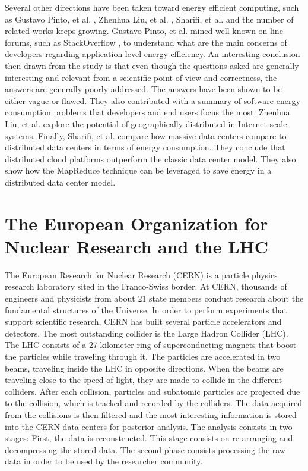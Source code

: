 Several other directions have been taken toward energy efficient computing, such as Gustavo Pinto, et al. \cite{QUESTIONS_ENERGY}, Zhenhua Liu, et al. \cite{GREENING}, Sharifi, et al.
\cite{ENERGY_DILEMMA} and the number of related works keeps growing. Gustavo Pinto, et al. \cite{QUESTIONS_ENERGY} mined well-known on-line forums, such as StackOverflow \cite{STACKOVERFLOW}, to understand what are the main concerns of developers regarding application level energy efficiency. An interesting conclusion then drawn from the study is that even though the questions asked are generally interesting and relevant from a scientific point of view and correctness, the answers are generally poorly addressed. The answers have been shown to be either vague or flawed. They also contributed with a summary of software energy consumption problems that developers and end users focus the most. Zhenhua Liu, et al. \cite{GREENING} explore the potential of geographically distributed in Internet-scale systems. Finally, Sharifi, et al. \cite{ENERGY_DILEMMA} compare how massive data centers compare to distributed data centers in terms of energy consumption. They conclude that distributed cloud platforms outperform the classic data center model. They also show how the MapReduce technique can be leveraged to save energy in a distributed data center model. 

\section{The European Organization for Nuclear Research and the LHC}

The European Research for Nuclear Research (CERN) \cite{CERN} is a particle physics
research laboratory sited in the Franco-Swiss border. At CERN, thousands of
engineers and physicists from about 21 state members conduct research about the
fundamental structures of the Universe. In order to perform experiments that
support scientific research, CERN has built several particle accelerators and detectors.
The most outstanding collider is the Large Hadron Collider (LHC). The LHC
consists of a 27-kilometer ring of superconducting magnets that boost the
particles while traveling through it. The particles are accelerated in two
beams, traveling inside the LHC in opposite directions. When the beams are
traveling close to the speed of light, they are made to collide in the different
colliders. After each collision, particles and subatomic particles are projected
due to the collision, which is tracked and recorded by the colliders. The data
acquired from the collisions is then filtered and the most interesting
information is stored into the CERN data-centers for posterior analysis. The analysis consists in two stages: First, the data is reconstructed. This stage consists on re-arranging and decompressing the stored data. The second phase consists processing the raw data in order to be used by the researcher community.

